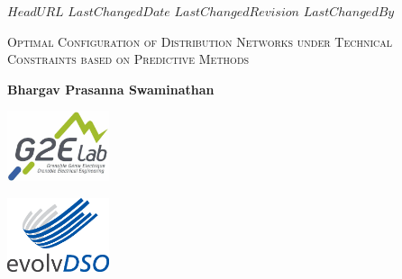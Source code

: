 \svnidlong
{$HeadURL$}
{$LastChangedDate$}
{$LastChangedRevision$}
{$LastChangedBy$}

\thispagestyle{titlepage}

\begin{center}
  \newlength{\parSepLength}
  \setlength{\parSepLength}{10ex}

  \Large
  \centering

  \thinRule\par
  \par\vspace{0.15\parSepLength}
  \begin{minipage}{\textwidth}
    \centering
    \fontsize{33pt}{37pt}\selectfont\titleColor\scshape
    Optimal Configuration of Distribution Networks under Technical Constraints based on Predictive Methods
  \end{minipage}
  \par\vspace{0.25\parSepLength}
  \par\thinRule

  \vspace{0.25\parSepLength}

  \begin{minipage}{\textwidth}
    \centering
    \Large
    \textbf{Bhargav Prasanna Swaminathan}
  \end{minipage}

  \vfill

  \begin{minipage}[!h]{.3\textwidth}
  \centering
  \newlength\figureheight
  \newlength\figurewidth
  \setlength\figureheight{1cm}
  \setlength\figurewidth{1cm}
  
  \end{minipage}
  \begin{minipage}[!h]{.3\textwidth}
  \centering
  \includegraphics[width=30mm]{Logos/g2elab_logo.jpg}
  \end{minipage}
  \begin{minipage}[!h]{.3\textwidth}
  \centering
  \includegraphics[width=30mm]{Logos/evolvDSO_logo.eps}
  \end{minipage}


\end{center}

